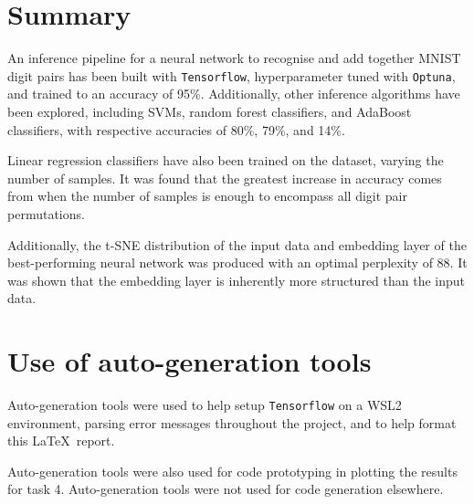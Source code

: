 \documentclass[11pt,a4paper]{article}
\begin{document}
\section{Summary}
An inference pipeline for a neural network to recognise and add together MNIST digit pairs has been built with \texttt{Tensorflow}, hyperparameter tuned with \texttt{Optuna}, and trained to an accuracy of 95\%. Additionally, other inference algorithms have been explored, including SVMs, random forest classifiers, and AdaBoost classifiers, with respective accuracies of 80\%, 79\%, and 14\%. 

Linear regression classifiers have also been trained on the dataset, varying the number of samples. It was found that the greatest increase in accuracy comes from when the number of samples is enough to encompass all digit pair permutations.

Additionally, the t-SNE distribution of the input data and embedding layer of the best-performing neural network was produced with an optimal perplexity of 88. It was shown that the embedding layer is inherently more structured than the input data.
\clearpage


\appendix
\section{Use of auto-generation tools}
Auto-generation tools were used to help setup \texttt{Tensorflow} on a WSL2 environment, parsing error messages throughout the project, and to help format this \LaTeX\ report.

Auto-generation tools were also used for code prototyping in plotting the results for task 4. Auto-generation tools were not used for code generation elsewhere.
\end{document}
